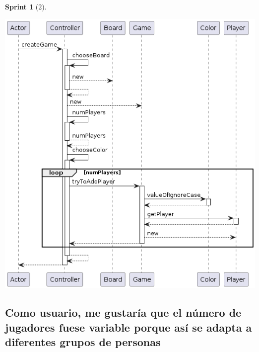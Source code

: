 \documentclass{article}
\theoremstyle{break}
\newtheorem*{sprint}{Sprint}
\begin{document}
\begin{sprint}[2]
\begin{center}
\includegraphics[scale=0.5]{Controller.createGame()-sprint2.png} 
\end{center}
\end{sprint}

\subsection{Como usuario, me gustaría que el número de jugadores fuese variable porque así se adapta a diferentes grupos de personas}
\end{document}
